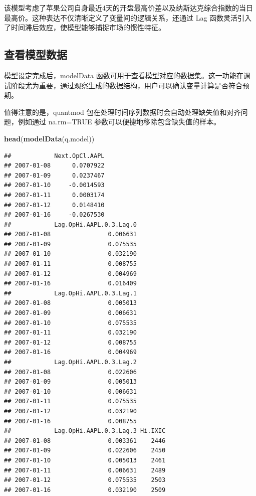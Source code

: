 \documentclass[]{ctexbook}
\newenvironment{Shaded}{\begin{snugshade}}{\end{snugshade}}
\newcommand{\FunctionTok}[1]{\textcolor[rgb]{0.13,0.29,0.53}{\textbf{#1}}}
\newcommand{\NormalTok}[1]{#1}
\begin{document}
该模型考虑了苹果公司自身最近4天的开盘最高价差以及纳斯达克综合指数的当日最高价。这种表达不仅清晰定义了变量间的逻辑关系，还通过 Lag 函数灵活引入了时间滞后效应，使模型能够捕捉市场的惯性特征。

\subsection{查看模型数据}\label{ux67e5ux770bux6a21ux578bux6570ux636e}

模型设定完成后，modelData 函数可用于查看模型对应的数据集。这一功能在调试阶段尤为重要，通过观察生成的数据结构，用户可以确认变量计算是否符合预期。

值得注意的是，quantmod 包在处理时间序列数据时会自动处理缺失值和对齐问题，例如通过 na.rm=TRUE 参数可以便捷地移除包含缺失值的样本。

\begin{Shaded}
\begin{Highlighting}[]
\FunctionTok{head}\NormalTok{(}\FunctionTok{modelData}\NormalTok{(q.model))}
\end{Highlighting}
\end{Shaded}

\begin{verbatim}
##            Next.OpCl.AAPL
## 2007-01-08      0.0707922
## 2007-01-09      0.0237467
## 2007-01-10     -0.0014593
## 2007-01-11      0.0003174
## 2007-01-12      0.0148410
## 2007-01-16     -0.0267530
##            Lag.OpHi.AAPL.0.3.Lag.0
## 2007-01-08                0.006631
## 2007-01-09                0.075535
## 2007-01-10                0.032190
## 2007-01-11                0.008755
## 2007-01-12                0.004969
## 2007-01-16                0.016409
##            Lag.OpHi.AAPL.0.3.Lag.1
## 2007-01-08                0.005013
## 2007-01-09                0.006631
## 2007-01-10                0.075535
## 2007-01-11                0.032190
## 2007-01-12                0.008755
## 2007-01-16                0.004969
##            Lag.OpHi.AAPL.0.3.Lag.2
## 2007-01-08                0.022606
## 2007-01-09                0.005013
## 2007-01-10                0.006631
## 2007-01-11                0.075535
## 2007-01-12                0.032190
## 2007-01-16                0.008755
##            Lag.OpHi.AAPL.0.3.Lag.3 Hi.IXIC
## 2007-01-08                0.003361    2446
## 2007-01-09                0.022606    2450
## 2007-01-10                0.005013    2461
## 2007-01-11                0.006631    2489
## 2007-01-12                0.075535    2503
## 2007-01-16                0.032190    2509
\end{verbatim}
\end{document}
